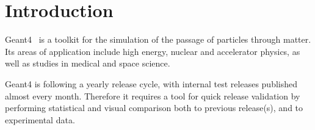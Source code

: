 \section{Introduction}
\label{sec-introduction}
Geant4~\cite{Geant4} is a toolkit for the simulation of the passage of particles through matter. Its areas of application include high energy, nuclear and accelerator physics, as well as studies in medical and space science. 

Geant4 is following a yearly release cycle, with internal test releases published almost every month. Therefore it requires a tool for quick release validation by performing statistical and visual comparison both to previous release(s), and to experimental data. 
%
